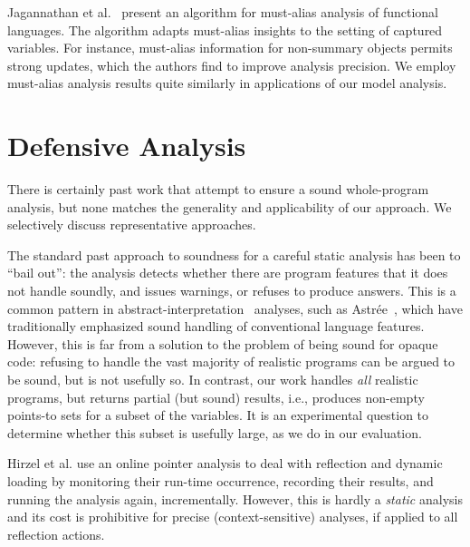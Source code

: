 Jagannathan et al.~\cite{popl:1998:Jagannathan} present
an algorithm for must-alias analysis of functional languages. The
algorithm adapts must-alias insights to the setting of captured
variables.
For instance, must-alias information for
non-summary objects permits strong updates, which the authors find to
improve analysis precision. We employ must-alias analysis results
quite similarly in applications of our model analysis.






\section{Defensive Analysis}

There is certainly past work that attempt to ensure a sound
whole-program analysis, but none matches the generality and
applicability of our approach. We selectively discuss representative
approaches.

The standard past approach to soundness for a careful static analysis
has been to ``bail out'': the analysis detects whether there are
program features that it does not handle soundly, and issues warnings,
or refuses to produce answers. This is a common pattern in
abstract-interpretation~\cite{popl:1977:Cousot} analyses,
such as Astr\'{e}e~\cite{sas:2007:Delmas}, which have traditionally
emphasized sound handling of conventional language features. However,
this is far from a solution to the problem of being sound for opaque
code: refusing to handle the vast majority of realistic programs can
be argued to be sound, but is not usefully so. In contrast, our work
handles \emph{all} realistic programs, but returns partial (but sound)
results, i.e., produces non-empty points-to sets for a subset of the
variables. It is an experimental question to determine whether
this subset is usefully large, as we do in our evaluation.

Hirzel et al. \cite{ecoop:2004:Hirzel,article:2007:Hirzel} use an
online pointer analysis to deal with reflection and dynamic loading by
monitoring their run-time occurrence, recording their results, and
running the analysis again, incrementally. However, this is hardly a
\emph{static} analysis and its cost is prohibitive for precise
(context-sensitive) analyses, if applied to all reflection
actions. 

